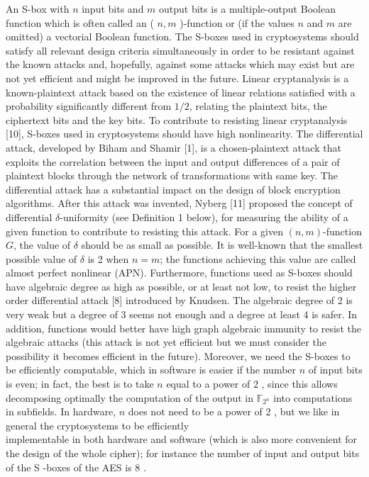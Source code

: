 \documentclass[10pt]{article}
\begin{document}
An S-box with $n$ input bits and $m$ output bits is a multiple-output Boolean function which is often called an ( $n, m$ )-function or (if the values $n$ and $m$ are omitted) a vectorial Boolean function. The S-boxes used in cryptosystems should satisfy all relevant design criteria simultaneously in order to be resistant against the known attacks and, hopefully, against some attacks which may exist but are not yet efficient and might be improved in the future. Linear cryptanalysis is a known-plaintext attack based on the existence of linear relations satisfied with a probability significantly different from $1 / 2$, relating the plaintext bits, the ciphertext bits and the key bits. To contribute to resisting linear cryptanalysis [10], S-boxes used in cryptosystems should have high nonlinearity. The differential attack, developed by Biham and Shamir [1], is a chosen-plaintext attack that exploits the correlation between the input and output differences of a pair of plaintext blocks through the network of transformations with same key. The differential attack has a substantial impact on the design of block encryption algorithms. After this attack was invented, Nyberg [11] proposed the concept of differential $\delta$-uniformity (see Definition 1 below), for measuring the ability of a given function to contribute to resisting this attack. For a given $(n, m)$-function $G$, the value of $\delta$ should be as small as possible. It is well-known that the smallest possible value of $\delta$ is 2 when $n=m$; the functions achieving this value are called almost perfect nonlinear (APN). Furthermore, functions used as S-boxes should have algebraic degree as high as possible, or at least not low, to resist the higher order differential attack [8] introduced by Knudsen. The algebraic degree of 2 is very weak but a degree of 3 seems not enough and a degree at least 4 is safer. In addition, functions would better have high graph algebraic immunity to resist the algebraic attacks (this attack is not yet efficient but we must consider the possibility it becomes efficient in the future). Moreover, we need the S-boxes to be efficiently computable, which in software is easier if the number $n$ of input bits is even; in fact, the best is to take $n$ equal to a power of 2 , since this allows decomposing optimally the computation of the output in $\mathbb{F}_{2^{n}}$ into computations in subfields. In hardware, $n$ does not need to be a power of 2 , but we like in general the cryptosystems to be efficiently\\
implementable in both hardware and software (which is also more convenient for the design of the whole cipher); for instance the number of input and output bits of the S -boxes of the AES is 8 .
\end{document}
